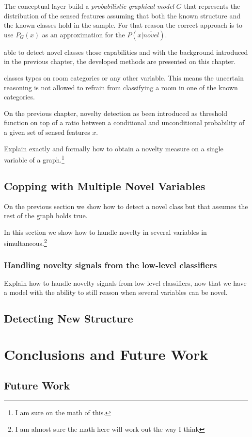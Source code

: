 The conceptual layer build a \emph{probabilistic graphical model} $G$ that
represents the distribution of the sensed features assuming that both the known
structure and the known classes hold in the sample.
For that reason the correct approach is to use $P_G(x)$ as an approximation for
the $P(x|\overline{novel})$.

\begin{figure}[h]
\centering
{}
\qquad\qquad
{}
\end{figure}


able to detect novel classes those capabilities 
and with the background introduced in the previous chapter,
the developed methods are presented on this chapter.


classes types on room categories
or any other variable.
This means the uncertain reasoning is not allowed to refrain from classifying
a room in one of the known categories.

On the previous chapter, novelty detection as been introduced as threshold
function on top of a ratio between a conditional and unconditional
probability of a given set of sensed features $x$.

Explain exactly and formally how to obtain a novelty measure on a single
variable of a graph.\footnote{I am sure on the math of this.}

\section{Copping with Multiple Novel Variables}
On the previous section we show how to detect a novel class but that assumes
the rest of the graph holds true.

In this section we show how to handle novelty in several variables
in simultaneous.\footnote{I am almost sure the math here will work out the
way I think}

\subsection{Handling novelty signals from the low-level classifiers}
Explain how to handle novelty signals from low-level classifiers, now that we
have a model with the ability to still reason when several variables can be
novel.

\section{Detecting New Structure}

\chapter{Conclusions and Future Work}\label{chap:conclusions}
\section{Future Work}

